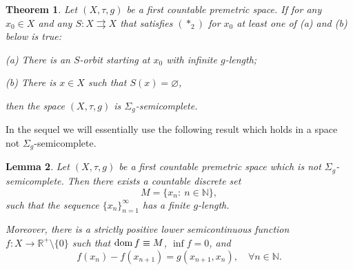\documentclass[12pt]{article}
\newtheorem{theorem}{Theorem}[section]
\newtheorem{lemma}[theorem]{Lemma}
\def\dom{\mathop{\rm dom}}
\newcommand{\astwo}{(\ast_2)}
\begin{document}
\begin{theorem}\label{LOEV inverse} 
Let  $(X,\tau,g)$ be a first countable premetric space. If for  any $x_0\in X$ and any $S:X \rightrightarrows X$ that satisfies $\astwo$ for   $x_0 $ at least one of (a) and (b) below is true:

(a) There is an $S$-orbit starting at $x_0$ with infinite $g$-length;

(b) There is ${x} \in X$ such that $S({x})=\varnothing$,

\noindent
then the space $(X,\tau,g)$ is  $\Sigma_g$-semicomplete.
\end{theorem}
In the sequel we will essentially use the following result which holds in a space not $\Sigma_g$-semicomplete.
\begin{lemma}
    \label{rem:1}
    Let  $(X,\tau,g)$ be a first countable premetric space which is not $\Sigma_g$-semicomplete. Then there exists a countable discrete set
    $$
        M = \{x_n:\ n\in\mathbb{N}\},
    $$
    such that the sequence $\{x_n\}_{n=1}^\infty$ has a finite $g$-length.

    Moreover, there is a strictly positive lower semicontinuous function $f:X\to\mathbb{R}^+\setminus\{0\}$ such that $\dom f \equiv M$, $\inf f = 0$, and
    \begin{equation}
        \label{eq:f-g-M-rel}
        f(x_n) - f(x_{n+1}) = g(x_{n+1},x_n), \quad\forall n\in\mathbb{N}.
    \end{equation}
\end{lemma}
\end{document}
